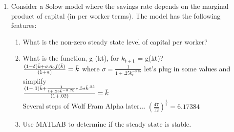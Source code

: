 \documentclass[12pt,oneside,reqno]{amsart}
\begin{document}
\begin{enumerate}
\item Consider a Solow model where the savings rate depends on the marginal product of capital (in per worker terms). The model has the following features:
\begin{enumerate}
    \item What is the non-zero steady state level of capital per worker?
    \item What is the function, g (kt), for $k_{t+1}$ = g(kt)?\\
    $\frac{(1-\delta)\Bar{k}+\sigma A_0 f(\Bar{k})}{(1+n)} = \Bar{k}$ where $\sigma = \frac{1}{1+.25k_t^{-0.75}}$ let's plug in some values and simplify\\
    $\frac{(1-.1)\Bar{k}+\frac{1}{1+.25\Bar{k}^{-0.75}}*.5*\Bar{k}^{.25}}{(1+.02)}=\Bar{k}$\\
    Several steps of Wolf Fram Alpha later... $\left(\frac{47}{12}\right)^{\frac{4}{3}}=6.17384$
    \item Use MATLAB to determine if the steady state is stable.
\end{enumerate}

\end{enumerate}
\end{document}
